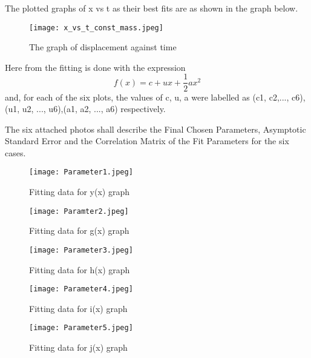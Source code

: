 \documentclass[12pt, letterpaper]{article}
\begin{document}
The plotted graphs of x vs t as their best fits are as shown in the graph below.

\begin{figure} [h]
    \centering
    \texttt{[image: x\_vs\_t\_const\_mass.jpeg]}
    \caption{The graph of displacement against time}
    \label{fig:fig2}
\end{figure}

Here from the fitting is done with the expression 
\begin{equation}
    f(x) = c + ux + \frac{1}{2}ax^2
\end{equation}
and, for each of the six plots, the values of c, u, a were labelled as (c1, c2,..., c6),(u1, u2, ..., u6),(a1, a2, ..., a6) respectively. 

The six attached photos shall describe the Final Chosen Parameters, Asymptotic Standard Error and the Correlation Matrix of the Fit Parameters for the six cases.

\vspace{1cm}

\begin{figure}[!ht]
    \centering
    \texttt{[image: Parameter1.jpeg]}
    \caption{Fitting data for y(x) graph}
    \label{fig:fig3}
\end{figure}

\vspace{2cm}

\begin{figure}[!ht]
    \centering
    \texttt{[image: Paramter2.jpeg]}
    \caption{Fitting data for g(x) graph}
    \label{fig:fig4}
\end{figure}

\begin{figure}[!ht]
    \centering
    \texttt{[image: Parameter3.jpeg]}
    \caption{Fitting data for h(x) graph}
    \label{fig:fig5}
\end{figure}

\begin{figure}[!ht]
    \centering
    \texttt{[image: Parameter4.jpeg]}
    \caption{Fitting data for i(x) graph}
    \label{fig:fig6}
\end{figure}

\vspace{8cm}

\begin{figure}[!ht]
    \centering
    \texttt{[image: Parameter5.jpeg]}
    \caption{Fitting data for j(x) graph}
    \label{fig:fig7}
\end{figure}
\end{document}
